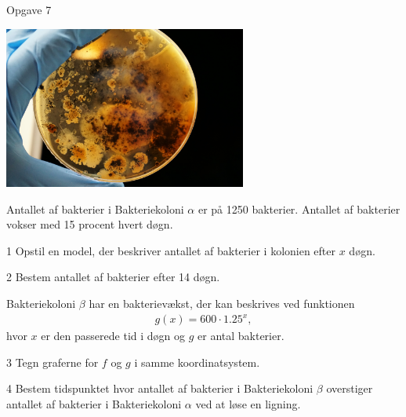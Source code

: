 \begin{opgavetekst}{Opgave 7}
	\begin{center}
		\includegraphics[width= 0.6\textwidth]{Billeder/Bakterie}
	\end{center}
	Antallet af bakterier i Bakteriekoloni $\alpha$ er på 1250 bakterier. Antallet af bakterier vokser med 15 procent hvert døgn.
\end{opgavetekst}
\begin{delopgave}{}{1}
	Opstil en model, der beskriver antallet af bakterier i kolonien efter $x$ døgn. 
\end{delopgave}
\begin{delopgave}{}{2}
	Bestem antallet af bakterier efter 14 døgn. 
\end{delopgave}
\begin{meretekst}
	Bakteriekoloni $\beta$ har en bakterievækst, der kan beskrives ved funktionen
	\begin{align*}
		g(x) = 600\cdot 1.25^x,
	\end{align*}
	hvor $x$ er den passerede tid i døgn og $g$ er antal bakterier. 
\end{meretekst}
\begin{delopgave}{}{3}
	Tegn graferne for $f$ og $g$ i samme koordinatsystem.
\end{delopgave}

\begin{delopgave}{}{4}
	Bestem tidspunktet hvor antallet af bakterier i Bakteriekoloni $\beta$ overstiger antallet af bakterier i Bakteriekoloni $\alpha$ ved at løse en ligning. 
\end{delopgave}	

